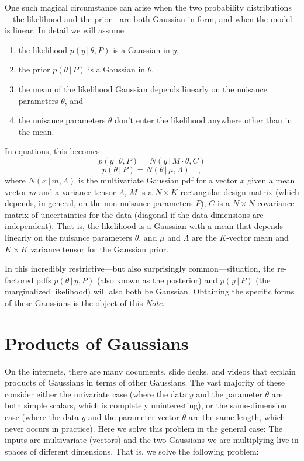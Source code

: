 \documentclass[12pt, letterpaper]{article}
\newcommand{\documentname}{\textsl{Note}}
\newcommand{\given}{\,|\,}
\begin{document}
One such magical circumstance can arise when the two probability
distributions---the likelihood and the prior---are both Gaussian in
form, and when the model is linear.
In detail we will assume
\begin{enumerate}
\item
the likelihood $p(y\given\theta, P)$ is a Gaussian in $y$,
\item
the prior $p(\theta\given P)$ is a Gaussian in $\theta$,
\item
the mean of the likelihood Gaussian depends linearly on the nuisance
parameters $\theta$, and
\item
the nuisance parameters $\theta$ don't enter the likelihood anywhere
other than in the mean.
\end{enumerate}
In equations, this becomes:
\begin{equation}
p(y\given\theta, P) = N(y\given M\cdot\theta, C)
\end{equation}
\begin{equation}
p(\theta\given P) = N(\theta\given \mu, \Lambda)
\quad ,
\end{equation}
where
$N(x\given m,\Lambda)$ is the multivariate Gaussian pdf for a vector $x$
given a mean vector $m$ and a variance tensor $\Lambda$,
$M$ is a $N\times K$ rectangular design matrix (which depends, in
general, on the non-nuisance parameters $P$),
$C$ is a $N\times N$ covariance matrix of uncertainties for the
data (diagonal if the data dimensions are independent).
That is, the likelihood is a Gaussian with a mean that depends
linearly on the nuisance parameters $\theta$, and
$\mu$ and $\Lambda$ are the $K$-vector mean and $K\times K$ variance tensor
for the Gaussian prior.

In this incredibly restrictive---but also surprisingly
common---situation, the re-factored pdfs $p(\theta\given y, P)$ (also
known as the posterior) and $p(y\given P)$ (the marginalized
likelihood) will also both be Gaussian.
Obtaining the specific forms of these Gaussians is the object of this
\documentname.

\section{Products of Gaussians}

On the internets, there are many documents, slide decks, and videos
that explain products of Gaussians in terms of other Gaussians.
The vast majority of these consider either the univariate case (where
the data $y$ and the parameter $\theta$ are both simple scalars, which
is completely uninteresting), or the same-dimension case (where the data
$y$ and the parameter vector $\theta$ are the same length, which never
occurs in practice).
Here we solve this problem in the general case:
The inputs are multivariate (vectors) and the two Gaussians we are
multiplying live in spaces of different dimensions.
That is, we solve the following problem:
\end{document}

